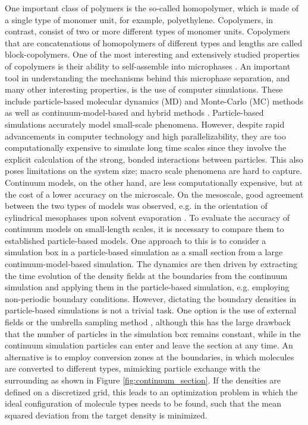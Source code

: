 \documentclass[bachelor,       %
               twoside,        %
               BCOR10mm,       %
               ngerman, english %
               ]{GAUBM}
\begin{document}
One important class of polymers is the so-called homopolymer, which is made of a single type of monomer unit, for example, polyethylene. Copolymers, in contrast, consist of two or more different types of monomer units. Copolymers that are concatenations of homopolymers of different types and lengths are called block-copolymers. One of the most interesting and extensively studied properties of copolymers is their ability to self-assemble into microphases \cite{leibler1980theory}. An important tool in understanding the mechanisms behind this microphase separation, and many other interesting properties, is the use of computer simulations. These include particle-based molecular dynamics (MD) and Monte-Carlo (MC) methods as well as continuum-model-based and hybrid methods \cite{Shuanhu2017}. Particle-based simulations accurately model small-scale phenomena. However, despite rapid advancements in computer technology and high parallelizability, they are too computationally expensive to simulate long time scales since they involve the explicit calculation of the strong, bonded interactions between particles. This also poses limitations on the system size; macro scale phenomena are hard to capture. Continuum models, on the other hand, are less computationally expensive, but at the cost of a lower accuracy on the microscale. On the mesoscale, good agreement between the two types of models was observed, e.g. in the orientation of cylindrical mesophases upon solvent evaporation \cite{Dreyer22}. To evaluate the accuracy of continuum models on small-length scales, it is necessary to compare them to established particle-based models. One approach to this is to consider a simulation box in a particle-based simulation as a small section from a large continuum-model-based simulation. The dynamics are then driven by extracting the time evolution of the density fields at the boundaries from the continuum simulation and applying them in the particle-based simulation, e.g. employing non-periodic boundary conditions. However, dictating the boundary densities in particle-based simulations is not a trivial task. One option is the use of external fields or the umbrella sampling method \cite{glenn74}, although this has the large drawback that the number of particles in the simulation box remains constant, while in the continuum simulation particles can enter and leave the section at any time. An alternative is to employ conversion zones at the boundaries, in which molecules are converted to different types, mimicking particle exchange with the surrounding as shown in Figure \ref{fig:continuum_section}. If the densities are defined on a discretized grid, this leads to an optimization problem in which the ideal configuration of molecule types needs to be found, such that the mean squared deviation from the target density is minimized. \\
\end{document}
